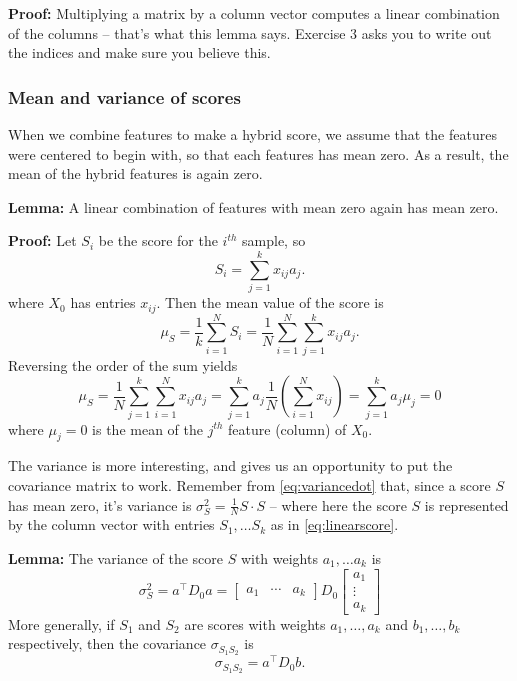 \documentclass[
]{article}
\begin{document}
\textbf{Proof:} Multiplying a matrix by a column vector computes a
linear combination of the columns -- that's what this lemma says.
Exercise 3 asks you to write out the indices and make sure you believe
this.

\hypertarget{mean-and-variance-of-scores}{%
\subsubsection{Mean and variance of
scores}\label{mean-and-variance-of-scores}}

When we combine features to make a hybrid score, we assume that the
features were centered to begin with, so that each features has mean
zero. As a result, the mean of the hybrid features is again zero.

\textbf{Lemma:} A linear combination of features with mean zero again
has mean zero.

\textbf{Proof:} Let \(S_{i}\) be the score for the \(i^{th}\) sample, so
\[
S_{i} = \sum_{j=1}^{k} x_{ij}a_{j}.
\] where \(X_{0}\) has entries \(x_{ij}\). Then the mean value of the
score is \[
\mu_{S} = \frac{1}{k}\sum_{i=1}^{N} S_{i} = \frac{1}{N}\sum_{i=1}^{N}\sum_{j=1}^{k} x_{ij}a_{j}.
\] Reversing the order of the sum yields \[
\mu_{S} = \frac{1}{N}\sum_{j=1}^{k}\sum_{i=1}^{N} x_{ij}a_{j} = \sum_{j=1}^{k} a_{j}\frac{1}{N}(\sum_{i=1}^{N} x_{ij})=
\sum_{j=1}^{k}a_{j}\mu_{j}=0
\] where \(\mu_{j}=0\) is the mean of the \(j^{th}\) feature (column) of
\(X_{0}\).

The variance is more interesting, and gives us an opportunity to put the
covariance matrix to work. Remember from \ref{eq:variancedot} that,
since a score \(S\) has mean zero, it's variance is
\(\sigma_{S}^2=\frac{1}{N}S\cdot S\) -- where here the score \(S\) is
represented by the column vector with entries \(S_{1},\ldots S_{k}\) as
in \cref{eq:linearscore}.

\textbf{Lemma:} The variance of the score \(S\) with weights
\(a_1,\ldots a_k\) is \begin{equation}
\sigma_{S}^2 = a^{\intercal}D_{0}a = \left[\begin{matrix}a_{1} & \cdots & a_{k}\end{matrix}\right]D_{0}
\left[\begin{matrix} a_{1} \\ \vdots \\ a_{k}\end{matrix}\right]
\label{eq:ada}\end{equation} More generally, if \(S_{1}\) and \(S_{2}\)
are scores with weights \(a_1,\ldots, a_k\) and \(b_1,\ldots, b_k\)
respectively, then the covariance \(\sigma_{S_{1}S_{2}}\) is \[
\sigma_{S_{1}S_{2}} = a^{\intercal}D_{0}b.
\]
\end{document}
